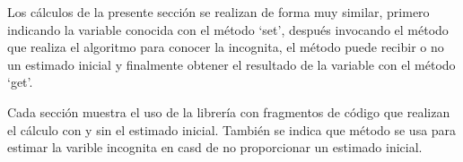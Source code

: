 	Los cálculos de la presente sección se realizan de forma muy similar, primero indicando la variable conocida con el método `set', después invocando el método que realiza el algoritmo para conocer la incognita, el método puede recibir o no un estimado inicial y finalmente obtener el resultado de la variable con el método `get'.

	Cada sección muestra el uso de la librería con fragmentos de código que realizan el cálculo con y sin el estimado inicial. También se indica que método se usa para estimar la varible incognita en casd de no proporcionar un estimado inicial.

		
